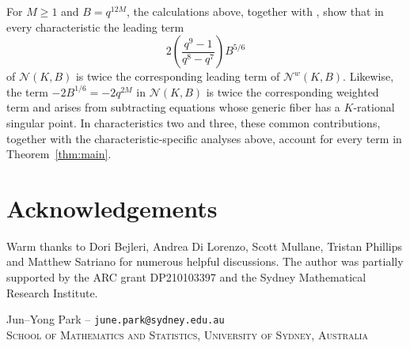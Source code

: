 \documentclass[a4paper,12pt]{amsart}
\theoremstyle{definition}
\newcommand{\Nc}{\mathcal{N}}
\begin{document}
For $M\geq1$ and $B=q^{12M}$, the calculations above, together with \cite[Theorem~9.7]{BPS}, show that in every characteristic the leading term
\[
2\left(\frac{q^9-1}{q^8-q^7}\right)B^{5/6}
\]
of $\Nc(K,B)$ is twice the corresponding leading term of $\Nc^w(K,B)$.  Likewise, the term $-2B^{1/6}=-2q^{2M}$ in $\Nc(K,B)$ is twice the corresponding weighted term and arises from subtracting equations whose generic fiber has a $K$-rational singular point.  In characteristics two and three, these common contributions, together with the characteristic-specific analyses above, account for every term in Theorem~\ref{thm:main}.

\medskip

    \section*{Acknowledgements}

    Warm thanks to Dori Bejleri, Andrea Di Lorenzo, Scott Mullane, Tristan Phillips and Matthew Satriano for numerous helpful discussions. The author was partially supported by the ARC grant DP210103397 and the Sydney Mathematical Research Institute.


    
    

    \vspace{+17pt}
    
    \noindent Jun--Yong Park \enspace -- \enspace \texttt{june.park@sydney.edu.au} \\
    \textsc{School of Mathematics and Statistics, University of Sydney, Australia} \\
\end{document}
